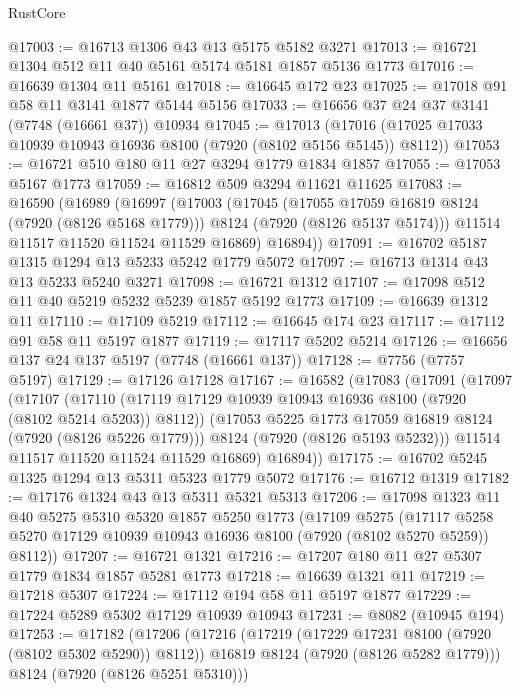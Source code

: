 \begin{lexlean}{RustCore}
\begin{coremodule}
@17003 := @16713 @1306 @43 @13 @5175 @5182 @3271
@17013 := @16721 @1304 @512 @11 @40 @5161 @5174 @5181 @1857 @5136 @1773
@17016 := @16639 @1304 @11 @5161
@17018 := @16645 @172 @23
@17025 := @17018 @91 @58 @11 @3141 @1877 @5144 @5156
@17033 := @16656 @37 @24 @37 @3141 (@7748 (@16661 @37)) @10934
@17045 := @17013
    (@17016 (@17025 @17033 @10939 @10943 @16936 @8100 (@7920 (@8102 @5156 @5145)) @8112))
@17053 := @16721 @510 @180 @11 @27 @3294 @1779 @1834 @1857
@17055 := @17053 @5167 @1773
@17059 := @16812 @509 @3294 @11621 @11625
@17083 := @16590
    (@16989
      (@16997
        (@17003
          (@17045
            (@17055 @17059 @16819 @8124 (@7920 (@8126 @5168 @1779)))
            @8124
            (@7920 (@8126 @5137 @5174)))
          @11514
          @11517
          @11520
          @11524
          @11529
          @16869)
        @16894))
@17091 := @16702 @5187 @1315 @1294 @13 @5233 @5242 @1779 @5072
@17097 := @16713 @1314 @43 @13 @5233 @5240 @3271
@17098 := @16721 @1312
@17107 := @17098 @512 @11 @40 @5219 @5232 @5239 @1857 @5192 @1773
@17109 := @16639 @1312 @11
@17110 := @17109 @5219
@17112 := @16645 @174 @23
@17117 := @17112 @91 @58 @11 @5197 @1877
@17119 := @17117 @5202 @5214
@17126 := @16656 @137 @24 @137 @5197 (@7748 (@16661 @137))
@17128 := @7756 (@7757 @5197)
@17129 := @17126 @17128
@17167 := @16582
    (@17083
      (@17091
        (@17097
          (@17107
            (@17110 (@17119 @17129 @10939 @10943 @16936 @8100 (@7920 (@8102 @5214 @5203)) @8112))
            (@17053 @5225 @1773 @17059 @16819 @8124 (@7920 (@8126 @5226 @1779)))
            @8124
            (@7920 (@8126 @5193 @5232)))
          @11514
          @11517
          @11520
          @11524
          @11529
          @16869)
        @16894))
@17175 := @16702 @5245 @1325 @1294 @13 @5311 @5323 @1779 @5072
@17176 := @16712 @1319
@17182 := @17176 @1324 @43 @13 @5311 @5321 @5313
@17206 := @17098
    @1323
    @11
    @40
    @5275
    @5310
    @5320
    @1857
    @5250
    @1773
    (@17109
      @5275
      (@17117 @5258 @5270 @17129 @10939 @10943 @16936 @8100 (@7920 (@8102 @5270 @5259)) @8112))
@17207 := @16721 @1321
@17216 := @17207 @180 @11 @27 @5307 @1779 @1834 @1857 @5281 @1773
@17218 := @16639 @1321 @11
@17219 := @17218 @5307
@17224 := @17112 @194 @58 @11 @5197 @1877
@17229 := @17224 @5289 @5302 @17129 @10939 @10943
@17231 := @8082 (@10945 @194)
@17253 := @17182
    (@17206
      (@17216
        (@17219 (@17229 @17231 @8100 (@7920 (@8102 @5302 @5290)) @8112))
        @16819
        @8124
        (@7920 (@8126 @5282 @1779)))
      @8124
      (@7920 (@8126 @5251 @5310)))

\end{coremodule}
\end{lexlean}
